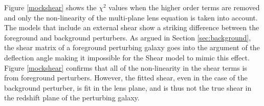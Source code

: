 Figure \ref{mockshear} shows the $\chi^2$ values when the higher order terms are removed and only the non-linearity of the multi-plane lens equation is taken into account. The models that include an external shear show a striking difference between the foreground and background perturbers. As argued in Section \ref{sec:background}, the shear matrix of a foreground perturbing galaxy goes into the argument of the deflection angle making it impossible for the Shear model to mimic this effect. Figure \ref{mockshear} confirms that all of the non-linearity in the shear terms is from foreground perturbers. However, the fitted shear, even in the case of the background perturber, is fit in the lens plane, and is thus not the true shear in the redshift plane of the perturbing galaxy. 